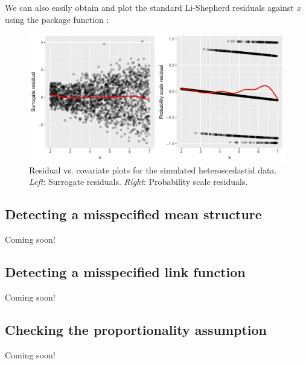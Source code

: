 We can also easily obtain and plot the standard Li-Shepherd residuals against $x$ using the  package function :

\begin{figure}
  \centering
  \includegraphics[width=1\textwidth]{heteroscedasticity}
  \caption{Residual vs. covariate plots for the simulated heteroscedastid data. \textit{Left}: Surrogate residuals. \textit{Right}: Probability scale residuals.}
  \label{fig:heteroscedasticity}
\end{figure}

\subsection{Detecting a misspecified mean structure}

Coming soon!


\subsection{Detecting a misspecified link function}

Coming soon!


\subsection{Checking the proportionality assumption}

Coming soon!


